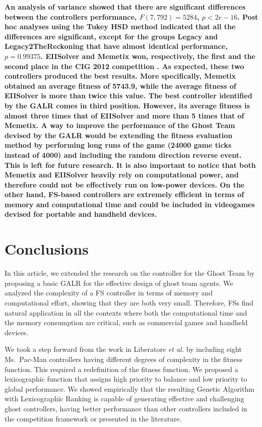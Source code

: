 \documentclass[journal]{IEEEtran}
\begin{document}
\textbf{An analysis of variance showed that there are significant differences between the controllers performance, $F(7,792) = 5284$, $p <2e-16$. Post hoc analyses using the Tukey HSD method indicated that all the differences are significant, except for the groups Legacy and Legacy2TheReckoning that have almost identical performance, $p = 0.99375$.
EIISolver and Memetix won, respectively, the first and the second place in the CIG 2012 competition \cite{CompetitionURL}. As expected, these two controllers produced the best results. More specifically, Memetix obtained an average fitness of 5743.9, while the average fitness of EIISolver is more than twice this value.
The best controller identified by the GALR comes in third position. However, its average fitness is almost three times that of EIISolver and more than 5 times that of Memetix. A way to improve the performance of the Ghost Team devised by the GALR would be extending the fitness evaluation method by performing long runs of the game (24000 game ticks instead of 4000) and including the random direction reverse event. This is left for future research. It is also important to notice that both Memetix and EIISolver heavily rely on computational power, and therefore could not be effectively run on low-power devices. On the other hand, FS-based controllers are extremely efficient in terms of memory and computational time and could be included in videogames devised for portable and handheld devices.}

\section{Conclusions}
\label{sec:Conclusions}
In this article, we extended the research on the controller for the
Ghost Team by proposing a basic GALR for the effective design of ghost team agents. We analyzed the complexity of a FS controller in terms of memory and computational effort, showing that they are both very small. Therefore, FSs find natural application in all the contexts where both the computational time and the memory consumption are critical, such as commercial games and handheld devices.

We took a step forward from the work in Liberatore \emph{et al.} \cite{Liberatore2014} by including eight Ms.\  Pac-Man controllers having different degrees of complexity in the fitness function. This required a redefinition of the fitness function. We proposed a lexicographic function that assigns high priority to balance and low priority to global performance. We showed empirically that the resulting Genetic Algorithm with Lexicographic Ranking is capable of generating effective and challenging ghost controllers, having better performance than other controllers included in the competition framework or presented in the literature.
\end{document}
